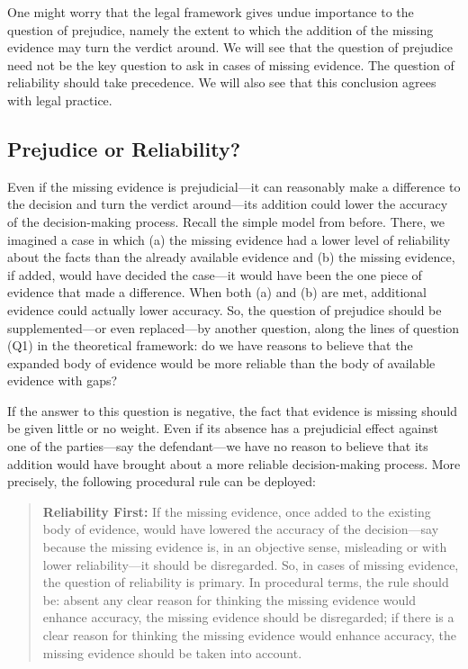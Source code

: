 \documentclass[
  10pt,
  dvipsnames,enabledeprecatedfontcommands]{scrartcl}
\begin{document}
One might worry that the legal framework gives undue importance to the
question of prejudice, namely the extent to which the addition of the
missing evidence may turn the verdict around. We will see that the
question of prejudice need not be the key question to ask in cases of
missing evidence. The question of reliability should take precedence. We
will also see that this conclusion agrees with legal practice.

\hypertarget{prejudice-or-reliability}{%
\subsection{Prejudice or Reliability?}\label{prejudice-or-reliability}}

Even if the missing evidence is prejudicial---it can reasonably make a
difference to the decision and turn the verdict around---its addition
could lower the accuracy of the decision-making process. Recall the
simple model from before. There, we imagined a case in which (a) the
missing evidence had a lower level of reliability about the facts than
the already available evidence and (b) the missing evidence, if added,
would have decided the case---it would have been the one piece of
evidence that made a difference. When both (a) and (b) are met,
additional evidence could actually lower accuracy. So, the question of
prejudice should be supplemented---or even replaced---by another
question, along the lines of question (Q1) in the theoretical framework:
do we have reasons to believe that the expanded body of evidence would
be more reliable than the body of available evidence with gaps?

If the answer to this question is negative, the fact that evidence is
missing should be given little or no weight. Even if its absence has a
prejudicial effect against one of the parties---say the defendant---we
have no reason to believe that its addition would have brought about a
more reliable decision-making process. More precisely, the following
procedural rule can be deployed:

\begin{quote} \textbf{Reliability First:} If the missing evidence, once added to the existing body of evidence, would have lowered the accuracy of the decision---say because the missing evidence is, in an objective sense, misleading or with lower reliability---it should be disregarded. So, in cases of missing evidence, the question of reliability is primary. In procedural terms, the rule should be: absent any clear reason for thinking the missing evidence would enhance accuracy, the missing evidence should be disregarded; if there is a clear reason for thinking the missing evidence would enhance accuracy, the missing evidence should be taken into account.
\end{quote}
\end{document}
